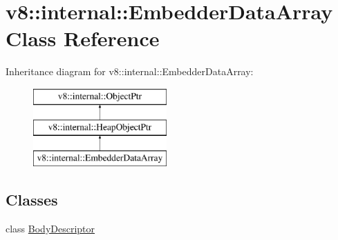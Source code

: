 \hypertarget{classv8_1_1internal_1_1EmbedderDataArray}{}\section{v8\+:\+:internal\+:\+:Embedder\+Data\+Array Class Reference}
\label{classv8_1_1internal_1_1EmbedderDataArray}
Inheritance diagram for v8\+:\+:internal\+:\+:Embedder\+Data\+Array\+:\begin{figure}[H]
\begin{center}
\leavevmode
\includegraphics[height=3.000000cm]{classv8_1_1internal_1_1EmbedderDataArray}
\end{center}
\end{figure}
\subsection*{Classes}
\begin{DoxyCompactItemize}
\item 
class \mbox{\hyperlink{classv8_1_1internal_1_1EmbedderDataArray_1_1BodyDescriptor}{Body\+Descriptor}}
\end{DoxyCompactItemize}
